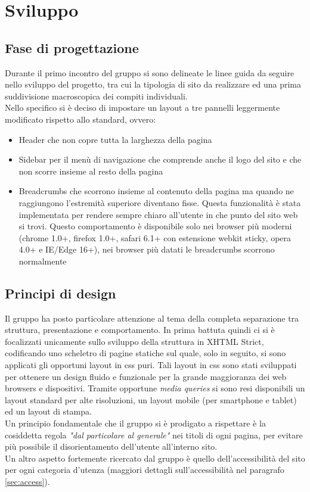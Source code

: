 \section{Sviluppo}

\vspace{8px}

\subsection{Fase di progettazione}
Durante il primo incontro del gruppo si sono delineate le linee guida da seguire nello sviluppo del progetto, tra cui la tipologia di sito da realizzare ed una prima suddivisione macroscopica dei compiti individuali.\\
Nello specifico si è deciso di impostare un layout a tre pannelli leggermente modificato rispetto allo standard, ovvero:
\begin{itemize}
 \item Header che non copre tutta la larghezza della pagina
 \item Sidebar per il menù di navigazione che comprende anche il logo del sito e che non scorre insieme al resto della pagina
 \item Breadcrumbs che scorrono insieme al contenuto della pagina ma quando ne raggiungono l'estremità superiore diventano fisse. Questa funzionalità è stata implementata per rendere sempre chiaro all'utente in che punto del sito web si trovi. Questo comportamento è disponibile solo nei browser più moderni (chrome 1.0+, firefox 1.0+, safari 6.1+ con estensione webkit sticky, opera 4.0+ e IE/Edge 16+), nei browser più datati le breadcrumbs scorrono normalmente
\end{itemize}

\vspace{8px}

\subsection{Principi di design}
Il gruppo ha posto particolare attenzione al tema della completa separazione tra struttura, presentazione e comportamento. In prima battuta quindi ci si è focalizzati unicamente sullo sviluppo della struttura in XHTML Strict, codificando uno scheletro di pagine statiche sul quale, solo in seguito, si sono applicati gli opportuni layout in css puri. Tali layout in css sono stati sviluppati per ottenere un design fluido e funzionale per la grande maggioranza dei web browsers e dispositivi. Tramite opportune \emph{media queries} si sono resi disponibili un layout standard per alte risoluzioni, un layout mobile (per smartphone e tablet) ed un layout di stampa. \\
Un principio fondamentale che il gruppo si è prodigato a rispettare è la cosiddetta regola \emph{"dal particolare al generale"} nei titoli di ogni pagina, per evitare più possibile il disorientamento dell'utente all'interno sito.\\
Un altro aspetto fortemente ricercato dal gruppo è quello dell'accessibilità del sito per ogni categoria d'utenza (maggiori dettagli sull'accessibilità nel paragrafo \ref{sec:access}).

